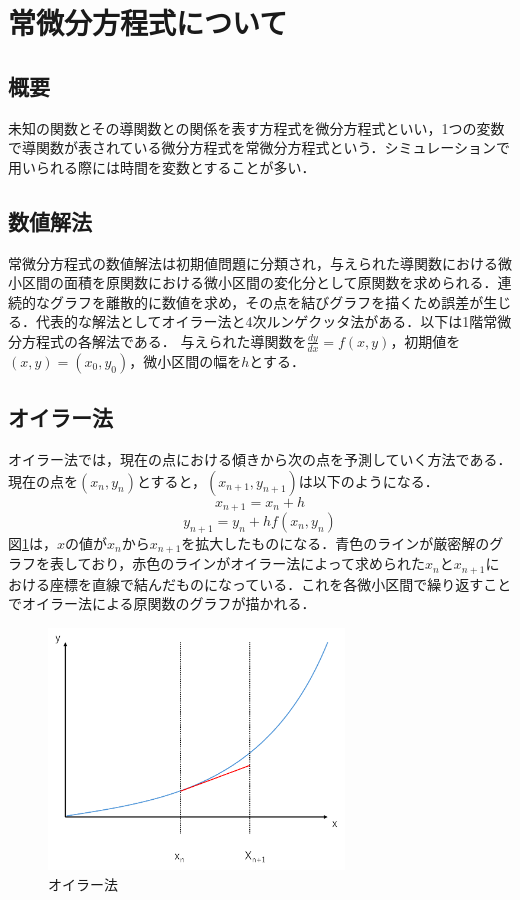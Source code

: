 \documentclass[a4paper, 12pt]{ltjsarticle}
\begin{document}
\section{常微分方程式について}
\subsection{概要}
未知の関数とその導関数との関係を表す方程式を微分方程式といい，1つの変数で導関数が表されている微分方程式を常微分方程式という．シミュレーションで用いられる際には時間を変数とすることが多い．
\subsection{数値解法}
常微分方程式の数値解法は初期値問題に分類され，与えられた導関数における微小区間の面積を原関数における微小区間の変化分として原関数を求められる．連続的なグラフを離散的に数値を求め，その点を結びグラフを描くため誤差が生じる．代表的な解法としてオイラー法と4次ルンゲクッタ法がある．以下は1階常微分方程式の各解法である．
与えられた導関数を$\frac{dy}{dx}=f(x,y)$，初期値を$(x,y)=(x_0,y_0)$，微小区間の幅を$h$とする．
\subsection{オイラー法}
オイラー法では，現在の点における傾きから次の点を予測していく方法である．現在の点を$(x_n,y_n)$とすると，$(x_{n+1},y_{n+1})$は以下のようになる．
\begin{equation}
  x_{n+1}=x_n+h
\end{equation}
\begin{equation}
  y_{n+1}=y_n+hf(x_n,y_n)
\end{equation}
図\ref{fig:オイラー法}は，$x$の値が$x_n$から$x_{n+1}$を拡大したものになる．青色のラインが厳密解のグラフを表しており，赤色のラインがオイラー法によって求められた$x_n$と$x_{n+1}$における座標を直線で結んだものになっている．これを各微小区間で繰り返すことでオイラー法による原関数のグラフが描かれる．
\begin{figure}[h]
\begin{center}
\includegraphics[clip,width=0.7\textwidth,keepaspectratio]{euler.pdf}
\end{center}
\caption{オイラー法}
\label{fig:オイラー法}
\end{figure}
\clearpage
\end{document}
